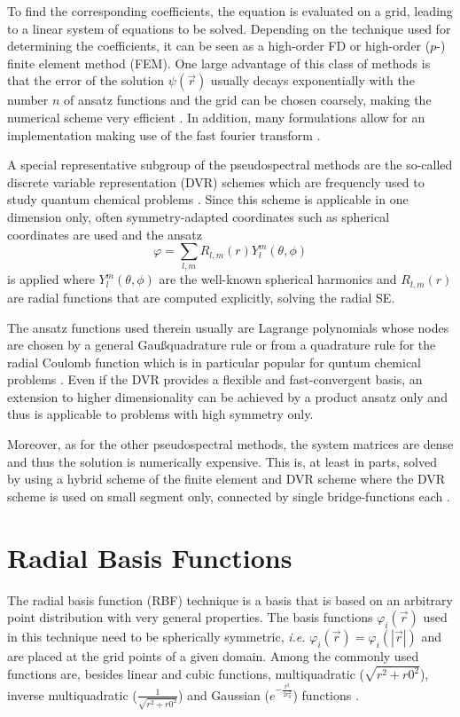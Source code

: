 To find the corresponding coefficients, the equation is evaluated on a grid, leading to a linear system of equations to be solved.
Depending on the technique used for determining the coefficients, it can be seen as a high-order FD or high-order ($p$-) finite element method (FEM).
One large advantage of this class of methods is that the error of the solution $\psi(\vec{r})$ usually decays exponentially with the number $n$ of ansatz functions and the grid can be chosen coarsely, making the numerical scheme very efficient \cite{PSbook, Tannor}.
In addition, many formulations allow for an implementation making use of the fast fourier transform \cite{PSbook}.

A special representative subgroup of the pseudospectral methods are the so-called discrete variable representation (DVR) schemes which are frequencly used to study quantum chemical problems \cite{yipDVR,impLDVR,coulDVR}.
Since this scheme is applicable in one dimension only, often symmetry-adapted coordinates such as spherical coordinates are used and the ansatz
\begin{equation}
  \varphi= \sum_{l, m} R_{l,m}(r) Y_l^m(\theta, \phi)
\end{equation}
is applied where $Y_l^m(\theta, \phi)$ are the well-known spherical harmonics \cite{SphHarm} and $R_{l,m}(r)$ are radial functions that are computed explicitly, solving the radial SE.

The ansatz functions used therein usually are Lagrange polynomials \cite{taoDVR,impLDVR,coulDVR} whose nodes are chosen by a general Gau\ss quadrature rule \cite{impLDVR} or from a quadrature rule for the radial Coulomb function which is in particular popular for quntum chemical problems \cite{coulDVR,Tannor}.
Even if the DVR provides a flexible and fast-convergent basis, an extension to higher dimensionality can be achieved by a product ansatz only and thus is applicable to problems with high symmetry only.

Moreover, as for the other pseudospectral methods, the system matrices are dense and thus the solution is numerically expensive.
This is, at least in parts, solved by using a hybrid scheme of the finite element and DVR scheme where the DVR scheme is used on small segment only, connected by single bridge-functions each \cite{taoDVR,impLDVR}.

\section{Radial Basis Functions}
The radial basis function (RBF) technique is a basis that is based on an arbitrary point distribution with very general properties.
The basis functions $\varphi_i(\vec{r})$ used in this technique need to be spherically symmetric, \textit{i.e.} $\varphi_i(\vec{r})=\varphi_i(|\vec{r}|)$ and are placed at the grid points of a given domain.
Among the commonly used functions are, besides linear and cubic functions, multiquadratic ($\sqrt { r^2 + r0^2 }$), inverse multiquadratic ($\frac{1}{ \sqrt { r^2 + r0^2}}$) and Gaussian ($ e^{-\frac{r^2}{2r_0^2}}$) functions \cite{rbfSE,rbfWave}.

